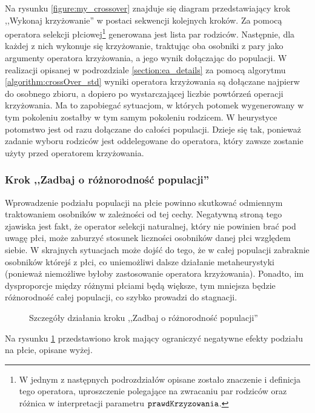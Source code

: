 \documentclass[./FM_mgr.tex]{subfiles}
\begin{document}
Na rysunku \ref{figure:my_crossover} znajduje się diagram przedstawiający krok ,,Wykonaj krzyżowanie'' w postaci sekwencji kolejnych kroków. Za pomocą operatora selekcji płciowej\footnote{
	W jednym z następnych podrozdziałów opisane zostało znaczenie i definicja tego operatora, uproszczenie polegające na zwracaniu par rodziców oraz różnica w interpretacji parametru $\mathtt{prawdKrzyzowania}$. 
} generowana jest lista par rodziców. 
Następnie, dla każdej z nich wykonuje się krzyżowanie, traktując oba osobniki z pary jako argumenty operatora krzyżowania, a jego wynik dołączając do populacji. 
W  realizacji opisanej w podrozdziale \ref{section:ea_details} za pomocą algorytmu \ref{algorithm:crossOver_std} wyniki operatora krzyżowania są dołączane najpierw do osobnego zbioru, a dopiero po wystarczającej liczbie powtórzeń operacji krzyżowania.
Ma to zapobiegać sytuacjom, w których potomek wygenerowany w tym pokoleniu zostałby w tym samym pokoleniu rodzicem.
W heurystyce potomstwo jest od razu dołączane do całości populacji.
Dzieje się tak, ponieważ zadanie wyboru rodziców jest oddelegowane do operatora, który zawsze zostanie użyty przed operatorem krzyżowania.

\subsubsection{Krok ,,Zadbaj o różnorodność populacji''} \label{subsubsection:fixing}

Wprowadzenie podziału populacji na płcie powinno skutkować odmiennym traktowaniem osobników w zależności od tej cechy. 
Negatywną stroną tego zjawiska jest fakt, że operator selekcji naturalnej, który nie powinien brać pod uwagę płci, może zaburzyć stosunek liczności osobników danej płci względem siebie. 
W skrajnych sytuacjach może dojść do tego, że w całej populacji zabraknie osobników którejś z płci, co uniemożliwi dalsze działanie metaheurystyki (ponieważ niemożliwe byłoby zastosowanie operatora krzyżowania). 
Ponadto, im dysproporcje między różnymi płciami będą większe, tym mniejsza będzie różnorodność całej populacji, co szybko prowadzi do stagnacji.

\newpage

\begin{figure}[H]
	\caption{Szczegóły działania kroku ,,Zadbaj o różnorodność populacji'' \label{figure:fixing}}
\end{figure}

Na rysunku \ref{figure:fixing} przedstawiono krok mający ograniczyć negatywne efekty podziału na płcie, opisane wyżej. 
\end{document}
